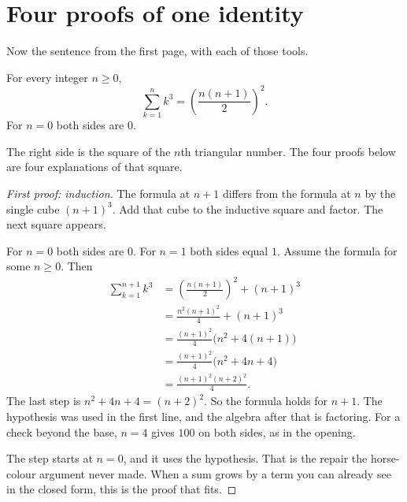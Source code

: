 \section{Four proofs of one identity}\label{sec:fourproofs}

Now the sentence from the first page, with each of those tools.

\begin{propositionx}
For every integer $n\ge0$,
\[
\sum_{k=1}^n k^3=\left(\frac{n(n+1)}{2}\right)^2.
\]
For $n=0$ both sides are $0$.
\end{propositionx}

The right side is the square of the $n$th triangular number. The four proofs below are four explanations of that square.

\begin{proof}[First proof: induction]
The formula at $n+1$ differs from the formula at $n$ by the single cube $(n+1)^3$. Add that cube to the inductive square and factor. The next square appears.

For $n=0$ both sides are $0$. For $n=1$ both sides equal $1$. Assume the formula for some $n\ge0$. Then
\begin{align*}
\sum_{k=1}^{n+1}k^3
&=\left(\frac{n(n+1)}{2}\right)^2+(n+1)^3\\
&=\frac{n^2(n+1)^2}{4}+(n+1)^3\\
&=\frac{(n+1)^2}{4}\bigl(n^2+4(n+1)\bigr)\\
&=\frac{(n+1)^2}{4}\bigl(n^2+4n+4\bigr)\\
&=\frac{(n+1)^2(n+2)^2}{4}.
\end{align*}
The last step is $n^2+4n+4=(n+2)^2$. So the formula holds for $n+1$. The hypothesis was used in the first line, and the algebra after that is factoring. For a check beyond the base, $n=4$ gives $100$ on both sides, as in the opening.

The step starts at $n=0$, and it uses the hypothesis. That is the repair the horse-colour argument never made. When a sum grows by a term you can already see in the closed form, this is the proof that fits.
\end{proof}

